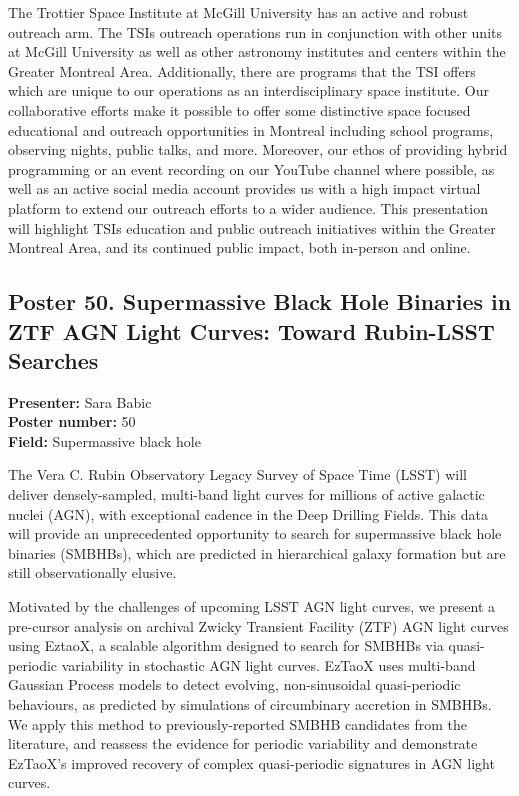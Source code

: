 The Trottier Space Institute at McGill University has an active and robust outreach arm. The TSIs outreach operations run in conjunction with other units at McGill University as well as other astronomy institutes and centers within the Greater Montreal Area. Additionally, there are programs that the TSI offers which are unique to our operations as an interdisciplinary space institute. Our collaborative efforts make it possible to offer some distinctive space focused educational and outreach opportunities in Montreal including school programs, observing nights, public talks, and more. Moreover, our ethos of providing hybrid programming or an event recording on our YouTube channel where possible, as well as an active social media account provides us with a high impact virtual platform to extend our outreach efforts to a wider audience. This presentation will highlight TSIs education and public outreach initiatives within the Greater Montreal Area, and its continued public impact, both in-person and online.

\hypertarget{poster-abstract-talk-206}{}\label{poster-abstract-page-talk-206}
\subsection*{Poster 50. Supermassive Black Hole Binaries in ZTF AGN Light Curves: Toward Rubin-LSST Searches}
\textbf{Presenter:} Sara Babic\\
\textbf{Poster number:} 50\\
\textbf{Field:} Supermassive black hole

The Vera C. Rubin Observatory Legacy Survey of Space Time (LSST) will deliver densely-sampled, multi-band light curves for millions of active galactic nuclei (AGN), with exceptional cadence in the Deep Drilling Fields. This data will provide an unprecedented opportunity to search for supermassive black hole binaries (SMBHBs), which are predicted in hierarchical galaxy formation but are still observationally elusive.

Motivated by the challenges of upcoming LSST AGN light curves, we present a pre-cursor analysis on archival Zwicky Transient Facility (ZTF) AGN light curves using EztaoX, a scalable algorithm designed to search for SMBHBs via quasi-periodic variability in stochastic AGN light curves. EzTaoX uses multi-band Gaussian Process models to detect evolving, non-sinusoidal quasi-periodic behaviours, as predicted by simulations of circumbinary accretion in SMBHBs. We apply this method to previously-reported SMBHB candidates from the literature, and reassess the evidence for periodic variability and demonstrate EzTaoX's improved recovery of complex quasi-periodic signatures in AGN light curves.

